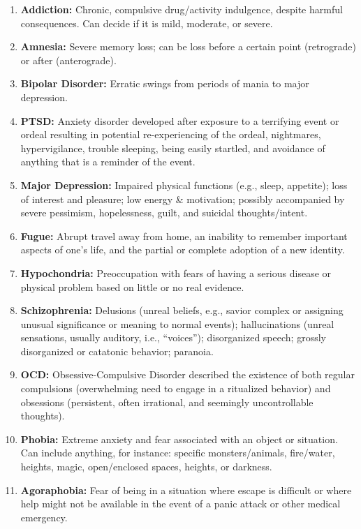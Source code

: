 \documentclass[12pt]{book}
\begin{document}
\begin{enumerate}
    \item \textbf{Addiction:} Chronic, compulsive drug/activity indulgence, despite harmful consequences. Can decide if it is mild, moderate, or severe.
    \item \textbf{Amnesia:} Severe memory loss; can be loss before a certain point (retrograde) or after (anterograde).
    \item \textbf{Bipolar Disorder:} Erratic swings from periods of mania to major depression.
    \item \textbf{PTSD:} Anxiety disorder developed after exposure to a terrifying event or ordeal resulting in potential re-experiencing of the ordeal, nightmares, hypervigilance, trouble sleeping, being easily startled, and avoidance of anything that is a reminder of the event.
    \item \textbf{Major Depression:} Impaired physical functions (e.g., sleep, appetite); loss of interest and pleasure; low energy \& motivation; possibly accompanied by severe pessimism, hopelessness, guilt, and suicidal thoughts/intent.
    \item \textbf{Fugue:} Abrupt travel away from home, an inability to remember important aspects of one’s life, and the partial or complete adoption of a new identity.
    \item \textbf{Hypochondria:} Preoccupation with fears of having a serious disease or physical problem based on little or no real evidence.
    \item \textbf{Schizophrenia:} Delusions (unreal beliefs, e.g., savior complex or assigning unusual significance or meaning to normal events); hallucinations (unreal sensations, usually auditory, i.e., “voices”); disorganized speech; grossly disorganized or catatonic behavior; paranoia.
    \item \textbf{OCD:} Obsessive-Compulsive Disorder described the existence of both regular compulsions (overwhelming need to engage in a ritualized behavior) and obsessions (persistent, often irrational, and seemingly uncontrollable thoughts).
    \item \textbf{Phobia:} Extreme anxiety and fear associated with an object or situation. Can include anything, for instance: specific monsters/animals, fire/water, heights, magic, open/enclosed spaces, heights, or darkness.
    \item \textbf{Agoraphobia:} Fear of being in a situation where escape is difficult or where help might not be available in the event of a panic attack or other medical emergency.

\end{enumerate}
\end{document}
